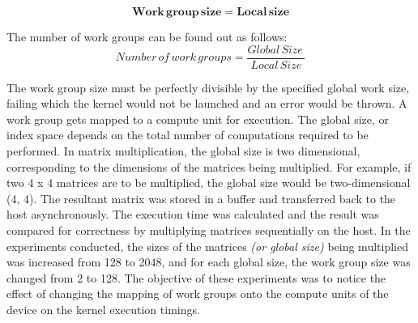 \begin{equation}
\mathbf{Work\, group\, size = Local\, size}
\end{equation}

The number of work groups can be found out as follows:
\[Number \, of \, work \, groups=\frac{Global \, Size \,}{Local \, Size}\]

The work group size must be perfectly divisible by the specified global work size, failing which the kernel would not be launched and an error would be thrown. A work group gets mapped to a compute unit for execution. \newline\newline
The global size, or index space depends on the total number of computations required to be performed. In matrix multiplication, the global size is two dimensional, corresponding to the dimensions of the matrices being multiplied. For example, if two 4 x 4 matrices are to be multiplied, the global size would be two-dimensional (4, 4). \newline\newline
The resultant matrix was stored in a buffer and transferred back to the host asynchronously. The execution time was calculated and the result was compared for correctness by multiplying matrices sequentially on the host.\newline\newline
In the experiments conducted, the sizes of the matrices \textit{(or global size)} being multiplied was increased from 128 to 2048, and for each global size, the work group size was changed from 2 to 128. The objective of these experiments was to notice the effect of changing the mapping of work groups onto the compute units of the device on the kernel execution timings.

